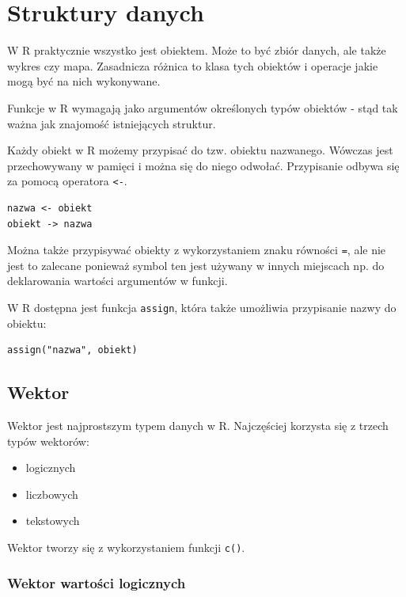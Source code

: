 \documentclass[]{book}
\providecommand{\tightlist}{%
  \setlength{\itemsep}{0pt}\setlength{\parskip}{0pt}}
\begin{document}
\chapter{Struktury danych}\label{struktury-danych}

W R praktycznie wszystko jest obiektem. Może to być zbiór danych, ale
także wykres czy mapa. Zasadnicza różnica to klasa tych obiektów i
operacje jakie mogą być na nich wykonywane.

Funkcje w R wymagają jako argumentów określonych typów obiektów - stąd
tak ważna jak znajomość istniejących struktur.

Każdy obiekt w R możemy przypisać do tzw. obiektu nazwanego. Wówczas
jest przechowywany w pamięci i można się do niego odwołać. Przypisanie
odbywa się za pomocą operatora \texttt{\textless{}-}.

\begin{verbatim}
nazwa <- obiekt
obiekt -> nazwa
\end{verbatim}

Można także przypisywać obiekty z wykorzystaniem znaku równości
\texttt{=}, ale nie jest to zalecane ponieważ symbol ten jest używany w
innych miejscach np. do deklarowania wartości argumentów w funkcji.

W R dostępna jest funkcja \texttt{assign}, która także umożliwia
przypisanie nazwy do obiektu:

\begin{verbatim}
assign("nazwa", obiekt)
\end{verbatim}

\section{Wektor}\label{wektor}

Wektor jest najprostszym typem danych w R. Najczęściej korzysta się z
trzech typów wektorów:

\begin{itemize}
\tightlist
\item
  logicznych
\item
  liczbowych
\item
  tekstowych
\end{itemize}

Wektor tworzy się z wykorzystaniem funkcji \texttt{c()}.

\subsection{Wektor wartości
logicznych}\label{wektor-wartosci-logicznych}
\end{document}
